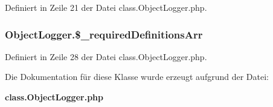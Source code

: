 Definiert in Zeile 21 der Datei class.ObjectLogger.php.
\subsubsection{\setlength{\rightskip}{0pt plus 5cm}ObjectLogger.\$\_\-requiredDefinitionsArr}\label{classObjectLogger_df651a233ca51d5632226904f6fd83b0}




Definiert in Zeile 28 der Datei class.ObjectLogger.php.

Die Dokumentation für diese Klasse wurde erzeugt aufgrund der Datei:\begin{CompactItemize}
\item 
{\bf class.ObjectLogger.php}\end{CompactItemize}
